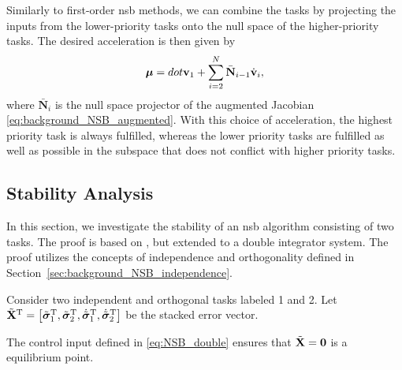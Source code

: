 Similarly to first-order \gls{nsb} methods, we can combine the tasks by projecting the inputs from the lower-priority tasks onto the null space of the higher-priority tasks.
The desired acceleration is then given by
\begin{equation}
    \bm{\mu} = dot{\mathbf{v}}_1 + \sum_{i=2}^N \bar{\mathbf{N}}_{i-1}\dot{\mathbf{v}}_i,
    \label{eq:NSB_double}
\end{equation}
where $\bar{\mathbf{N}}_i$ is the null space projector of the augmented Jacobian \eqref{eq:background_NSB_augmented}.
With this choice of acceleration, the highest priority task is always fulfilled, whereas the lower priority tasks are fulfilled as well as possible in the subspace that does not conflict with higher priority tasks.

\subsection{Stability Analysis}
In this section, we investigate the stability of an \gls{nsb} algorithm consisting of two tasks.
The proof is based on \cite{antonelli_stability_2008}, but extended to a double integrator system.
The proof utilizes the concepts of independence and orthogonality defined in Section~\ref{sec:background_NSB_independence}.

\begin{lemma}\label{theorem:one}
    Consider two independent and orthogonal tasks labeled 1 and 2.
    Let
    $
        \Tilde{\mathbf{X}}^{\mathrm{T}} = \left[\Tilde{\bm{\sigma}}_1^{\mathrm{T}}, \Tilde{\bm{\sigma}}_2^{\mathrm{T}}, \dot{\Tilde{\bm{\sigma}}}_1^{\mathrm{T}}, \dot{\Tilde{\bm{\sigma}}}_2^{\mathrm{T}} \right]
    $
    be the stacked error vector.

    The control input defined in \eqref{eq:NSB_double} ensures that $\Tilde{\mathbf{X}} = \mathbf{0}$ is a  equilibrium point.
\end{lemma}

